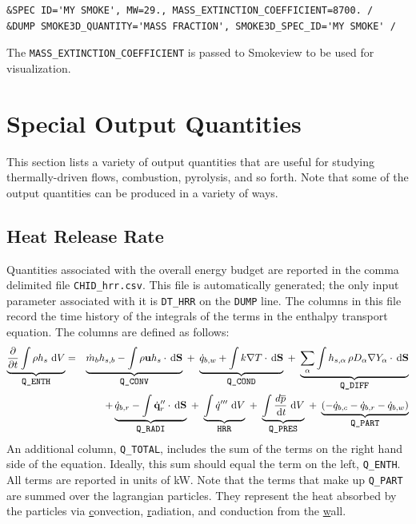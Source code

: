 \documentclass[11pt]{book}
\newcommand{\ct}{\tt\small}
\renewcommand{\d}{\,\mathrm{d}}
\newcommand{\bu}{{\bf u}}
\newcommand{\dq}{\dot{q}}
\newcommand{\dm}{\dot{m}}
\begin{document}
\footnotesize
\begin{verbatim}
&SPEC ID='MY SMOKE', MW=29., MASS_EXTINCTION_COEFFICIENT=8700. /
&DUMP SMOKE3D_QUANTITY='MASS FRACTION', SMOKE3D_SPEC_ID='MY SMOKE' /
\end{verbatim}

\normalsize
\noindent
The {\ct MASS\_EXTINCTION\_COEFFICIENT} is passed to Smokeview to be used for visualization.






\clearpage

\section{Special Output Quantities}

This section lists a variety of output quantities that are useful for studying thermally-driven flows, combustion, pyrolysis, and so forth. Note that some
of the output quantities can be produced in a variety of ways.


\subsection{Heat Release Rate}
\label{info:HRR}

Quantities associated with the overall energy budget are reported in
the comma delimited file {\ct CHID\_hrr.csv}.  This file is
automatically generated; the only input parameter associated with it
is {\ct DT\_HRR} on the {\ct DUMP} line. The columns in this file record the time history of the integrals of the terms in the enthalpy transport equation.
The columns are defined as follows:
\begin{eqnarray}
\label{eqn_enthalpytransport}
\underbrace{\frac{\partial}{\partial t} \int \rho h_s \, \d V }_{\hbox{\ct Q\_ENTH}} &=&
\underbrace{\dm_b h_{s,b} - \int \rho \bu h_s \cdot \d {\bf S}}_{\hbox{\ct Q\_CONV}}
\; + \; \underbrace{\dq_{b,w} + \int k \nabla T \cdot \d {\bf S}}_{\hbox{\ct Q\_COND}}
\; + \; \underbrace{\sum_\alpha \int h_{s,\alpha} \, \rho D_\alpha \nabla Y_\alpha \cdot \d {\bf S}}_{\hbox{\ct Q\_DIFF}}  \nonumber \\
&&
+\underbrace{\dq_{b,r} - \int \dot{\mathbf{q}}^{\prime\prime}_{r} \cdot \d {\bf S}}_{\hbox{\ct Q\_RADI}}
\; + \; \underbrace{\int \dot{q}''' \, \d V}_{\hbox{\ct HRR}}
\; + \; \underbrace{\int \frac{d \overline{p} }{\d t} \, \d V}_{\hbox{\ct Q\_PRES}}
\; + \; \underbrace{\left( -\dq_{b,c} - \dq_{b,r} - \dq_{b,w} \right) }_{\hbox{\ct Q\_PART}}
\end{eqnarray}
An additional column, {\ct Q\_TOTAL}, includes the sum of the terms on the right hand side of the equation. Ideally, this sum should equal the term on the left, {\ct Q\_ENTH}. All terms
are reported in units of kW. Note that the terms that make up {\ct Q\_PART} are summed over the lagrangian particles. They represent the heat absorbed by the particles via \underline{c}onvection, \underline{r}adiation, and conduction from the \underline{w}all.
\end{document}
